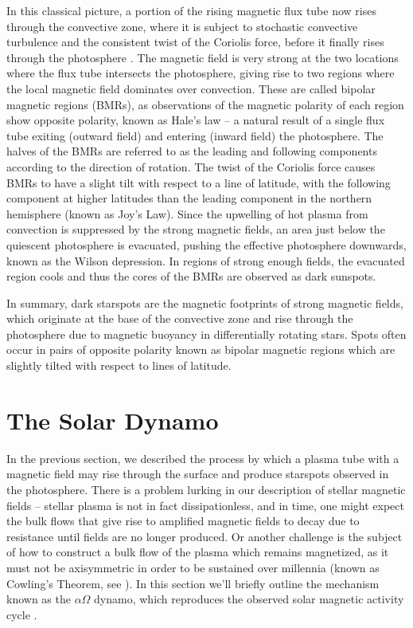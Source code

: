 In this classical picture, a portion of the rising magnetic flux tube now rises through the convective zone, where it is subject to stochastic convective turbulence and the consistent twist of the Coriolis force, before it finally rises through the photosphere \citep{Rempel2011, Cheung2014}. The magnetic field is very strong at the two locations where the flux tube intersects the photosphere, giving rise to two regions where the local magnetic field dominates over convection. These are called bipolar magnetic regions (BMRs), as observations of the magnetic polarity of each region show opposite polarity, known as Hale's law -- a natural result of a single flux tube exiting (outward field) and entering (inward field) the photosphere. The halves of the BMRs are referred to as the leading and following components according to the direction of rotation. The twist of the Coriolis force causes BMRs to have a slight tilt with respect to a line of latitude, with the following component at higher latitudes than the leading component in the northern hemisphere (known as Joy's Law). Since the upwelling of hot plasma from convection is suppressed by the strong magnetic fields, an area just below the quiescent photosphere is evacuated, pushing the effective photosphere downwards, known as the Wilson depression. In regions of strong enough fields, the evacuated region cools and thus the cores of the BMRs are observed as dark sunspots. 

In summary, dark starspots are the magnetic footprints of strong magnetic fields, which originate at the base of the convective zone and rise through the photosphere due to magnetic buoyancy in differentially rotating stars. Spots often occur in pairs of opposite polarity known as bipolar magnetic regions which are slightly tilted with respect to lines of latitude.

\section{The Solar Dynamo} \label{sec:solardynamo}

In the previous section, we described the process by which a plasma tube with a magnetic field may rise through the surface and produce starspots observed in the photosphere. There is a problem lurking in our description of stellar magnetic fields -- stellar plasma is not in fact dissipationless, and in time, one might expect the bulk flows that give rise to amplified magnetic fields to decay due to resistance until fields are no longer produced. Or another challenge is the subject of how to construct a bulk flow of the plasma which remains magnetized, as it must not be axisymmetric in order to be sustained over millennia (known as Cowling's Theorem, see \citealt{Cowling1933}). In this section we'll briefly outline the mechanism known as the $\alpha  \Omega$ dynamo, which reproduces the observed solar magnetic activity cycle \citep{Hathaway2010, Charbonneau2014}. 

